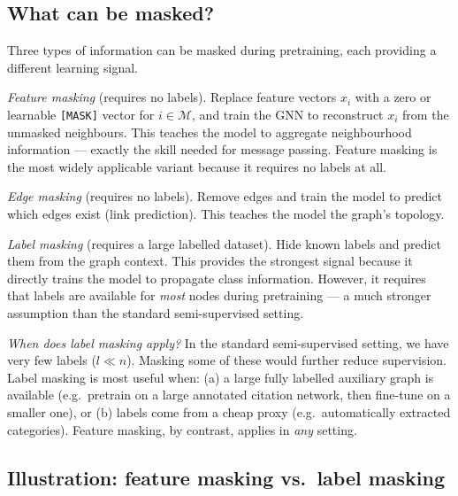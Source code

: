 \begin{notechapter}
\subsection{What can be masked?}

Three types of information can be masked during pretraining, each providing a
different learning signal.

\emph{Feature masking} (requires no labels). Replace feature vectors $x_i$
with a zero or learnable \texttt{[MASK]} vector for $i \in \mathcal{M}$, and
train the GNN to reconstruct $x_i$ from the unmasked neighbours. This teaches
the model to aggregate neighbourhood information --- exactly the skill needed for
message passing. Feature masking is the most widely applicable variant because
it requires no labels at all.

\emph{Edge masking} (requires no labels). Remove edges and train the model
to predict which edges exist (link prediction). This teaches the model the
graph's topology.

\emph{Label masking} (requires a large labelled dataset). Hide known labels
and predict them from the graph context. This provides the strongest signal
because it directly trains the model to propagate class information. However,
it requires that labels are available for \emph{most} nodes during
pretraining --- a much stronger assumption than the standard semi-supervised
setting.

\begin{pitfall}
\emph{When does label masking apply?} In the standard semi-supervised
setting, we have very few labels ($l \ll n$). Masking some of these
would further reduce supervision. Label masking is most useful when:
(a) a large fully labelled auxiliary graph is available (e.g.\ pretrain on a
large annotated citation network, then fine-tune on a smaller one), or
(b) labels come from a cheap proxy (e.g.\ automatically extracted
categories). Feature masking, by contrast, applies in \emph{any} setting.
\end{pitfall}

\subsection{Illustration: feature masking vs.\ label masking}

\begin{figure}[ht]
\centering
\begin{tikzpicture}[scale=1.15,
    node/.style={circle, draw, thick, minimum size=0.7cm, font=\small},
    masked/.style={circle, draw, thick, minimum size=0.7cm, font=\small,
      fill=gray!30, dashed}]


\end{tikzpicture}
\end{figure}
\end{notechapter}
